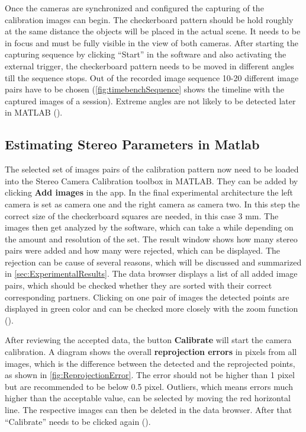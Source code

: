 Once the cameras are synchronized and configured the capturing of the calibration images can begin. The checkerboard pattern should be hold roughly at the same distance the objects will be placed in the actual scene. It needs to be in focus and must be fully visible in the view of both cameras. After starting the capturing sequence by clicking \enquote{Start} in the software and also activating the external trigger, the checkerboard pattern needs to be moved in different angles till the sequence stops. Out of the recorded image sequence 10-20 different image pairs have to be chosen (\autoref{fig:timebenchSequence} shows the timeline with the captured images of a session). Extreme angles are not likely to be detected later in MATLAB (\cite{StereoCalib.2016}).

\subsection{Estimating Stereo Parameters in Matlab}\label{ssec:estimateStereoParams}
The selected set of images pairs of the calibration pattern now need to be loaded into the Stereo Camera Calibration toolbox in MATLAB. They can be added by clicking \textbf{Add images} in the app. In the final experimental architecture the left camera is set as camera one and the right camera as camera two. In this step the correct size of the checkerboard squares are needed, in this case 3 mm. The images then get analyzed by the software, which can take a while depending on the amount and resolution of the set. The result window shows how many stereo pairs were added and how many were rejected, which can be displayed. The rejection can be cause of several reasons, which will be discussed and summarized in \autoref{sec:ExperimentalResults}. The data browser displays a list of all added image pairs, which should be checked whether they are sorted with their correct corresponding partners. Clicking on one pair of images the detected points are displayed in green color and can be checked more closely with the zoom function (\cite{StereoCalib.2016}).

After reviewing the accepted data, the button \textbf{Calibrate} will start the camera calibration. A diagram shows the overall \textbf{reprojection errors} in pixels from all images, which is the difference between the detected and the reprojected points, as shown in \autoref{fig:ReprojectionError}. The error should not be higher than 1 pixel but are recommended to be below 0.5 pixel. Outliers, which means errors much higher than the acceptable value, can be selected by moving the red horizontal line. The respective images can then be deleted in the data browser. After that \enquote{Calibrate} needs to be clicked again (\cite{StereoCalib.2016}).

